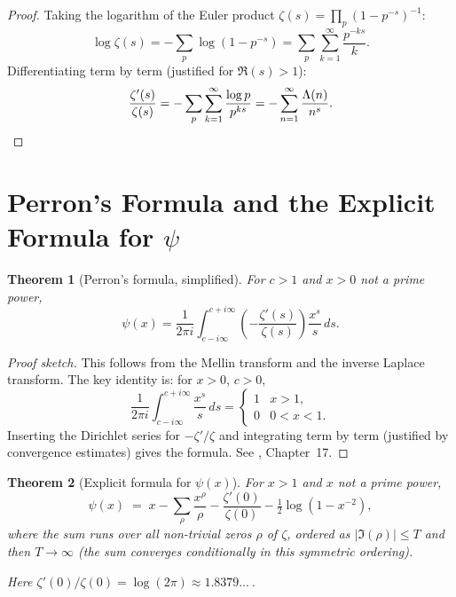\documentclass[12pt,a4paper]{amsart}
\newtheorem{theorem}{Theorem}[section]
\theoremstyle{definition}
\begin{document}
\begin{proof}
Taking the logarithm of the Euler product $\zeta(s) = \prod_p (1-p^{-s})^{-1}$:
\[
  \log\zeta(s) = -\sum_p \log(1 - p^{-s}) = \sum_p \sum_{k=1}^{\infty} \frac{p^{-ks}}{k}.
\]
Differentiating term by term (justified for $\Re(s) > 1$):
\[
  \frac{\zeta'(s)}{\zeta(s)} = -\sum_p \sum_{k=1}^{\infty} \frac{\log p}{p^{ks}}
  = -\sum_{n=1}^{\infty} \frac{\Lambda(n)}{n^s}. \qedhere
\]
\end{proof}

\section{Perron's Formula and the Explicit Formula for \texorpdfstring{$\psi$}{psi}}

\begin{theorem}[Perron's formula, simplified]
\label{thm:perron}
For $c > 1$ and $x > 0$ not a prime power,
\[
  \psi(x) = \frac{1}{2\pi i} \int_{c-i\infty}^{c+i\infty}
  \left(-\frac{\zeta'(s)}{\zeta(s)}\right) \frac{x^s}{s}\,ds.
\]
\end{theorem}

\begin{proof}[Proof sketch]
This follows from the Mellin transform and the inverse Laplace transform.
The key identity is: for $x > 0$, $c > 0$,
\[
  \frac{1}{2\pi i} \int_{c-i\infty}^{c+i\infty} \frac{x^s}{s}\,ds
  = \begin{cases} 1 & x > 1, \\ 0 & 0 < x < 1. \end{cases}
\]
Inserting the Dirichlet series for $-\zeta'/\zeta$ and integrating term by term
(justified by convergence estimates) gives the formula.
See \cite{Davenport2000}, Chapter~17.
\end{proof}

\begin{theorem}[Explicit formula for $\psi(x)$]
\label{thm:explicit_psi}
For $x > 1$ and $x$ not a prime power,
\begin{equation}
  \label{eq:explicit_psi}
  \psi(x) \;=\; x - \sum_\rho \frac{x^\rho}{\rho}
  - \frac{\zeta'(0)}{\zeta(0)} - \tfrac{1}{2}\log(1 - x^{-2}),
\end{equation}
where the sum runs over all non-trivial zeros $\rho$ of $\zeta$,
ordered as $|\Im(\rho)| \le T$ and then $T \to \infty$
(the sum converges conditionally in this symmetric ordering).

Here $\zeta'(0)/\zeta(0) = \log(2\pi) \approx 1.8379\ldots$\,.
\end{theorem}
\end{document}
